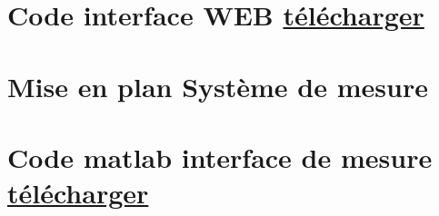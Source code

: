 \newpage
\section[Code interface WEB]{Code interface WEB \href{https://1drv.ms/u/s!Altwa7Vt0GlIj556q9wAVZ4g44uetA?e=RitRET}{télécharger}}\label{code:interface_web}


\newpage
\section[Mise en plan Système de mesure]{Mise en plan Système de mesure}\label{mise_en_plan_systeme_spray}

\begin{figure}[H]
    \centering
    
\end{figure}

\newpage
\section[Code matlab interface de mesure]{Code matlab interface de mesure \href{https://1drv.ms/f/s!Altwa7Vt0GlIj58Nf_KP9MAyebNbUA?e=5ZQHAe}{télécharger}}\label{code:interface_mesure_matlab}

